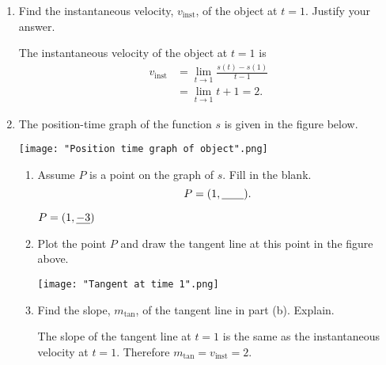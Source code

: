 \documentclass[nooutcomes]{ximera}
\begin{document}
\begin{problem}
\begin{enumerate}
    \item 
      Find the instantaneous velocity, $v_{\mathrm{inst}}$, of the object at $t = 1$.
      Justify your answer.
      \begin{freeResponse}
        The instantaneous velocity of the object at $t = 1$ is
        \begin{align*}
          v_{\mathrm{inst}} &= \lim_{t \to 1} \frac{s(t) - s(1)}{t-1} \\
          &= \lim_{t \to 1} t+1 = 2.
        \end{align*}
      \end{freeResponse}


    \item
      The position-time graph of the function $s$ is given in the figure below.
      \begin{image}
        \texttt{[image: "Position time graph of object".png]}
      \end{image}
      \begin{enumerate}
        \item
          Assume $P$ is a point on the graph of $s$.
          Fill in the blank.
          \[
            P = (1, \mbox{\underline{\hspace{2em}}}).
          \]
          \begin{freeResponse}
            $P = (1, \mbox{\underline{$-3$}})$
          \end{freeResponse}


        \item
          Plot the point $P$ and draw the tangent line at this point in the figure above.
          \begin{freeResponse}  \hfil
            \begin{image}
              \texttt{[image: "Tangent at time 1".png]}
            \end{image}
          \end{freeResponse}


        \item
          Find the slope, $m_{\mathrm{tan}}$, of the tangent line in part (b).
          Explain.
          \begin{freeResponse}
            The slope of the tangent line at $t = 1$ is the same as the instantaneous velocity at $t = 1$.
            Therefore $m_{\mathrm{tan}} = v_{\mathrm{inst}} = 2$.
          \end{freeResponse}
      \end{enumerate}


  \end{enumerate}
\end{problem}			










								
				
\end{document}
